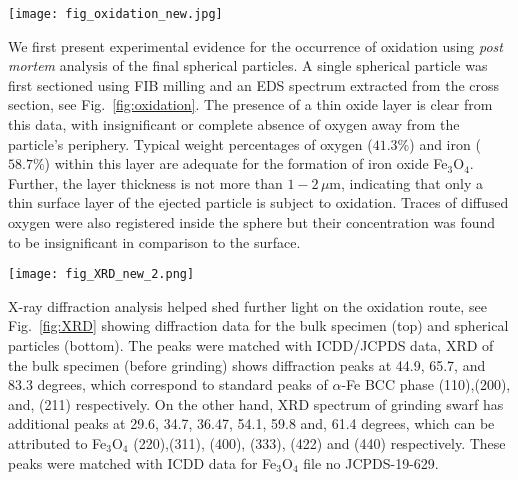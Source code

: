 \documentclass[11pt]{article}
\begin{document}
\begin{figure*}[h!]
   \centering
  \texttt{[image: fig\_oxidation\_new.jpg]}
  \caption{Elemental map showing spatial distribution of elemental oxygen within a thin layer of thickness $\delta$ around $1\%$ of the sphere's radius.}
  \label{fig:oxidation}
\end{figure*}

We first present experimental evidence for the occurrence of oxidation using \emph{post mortem} analysis of the final spherical particles. A single spherical particle was first sectioned using FIB milling and an EDS spectrum extracted from the cross section, see Fig.~\ref{fig:oxidation}. The presence of a thin oxide layer is clear from this data, with insignificant or complete absence of oxygen away from the particle's periphery. Typical weight percentages of oxygen ($41.3\%$) and iron ($58.7\%$) within this layer are adequate for the formation of iron oxide Fe$_3$O$_4$. Further, the layer thickness is not more than $1-2\,\mu$m, indicating that only a thin surface layer of the ejected particle is subject to oxidation. Traces of diffused oxygen were also registered inside the sphere but their concentration was found to be insignificant in comparison to the surface.


\begin{figure*}[h!]
   \centering
  \texttt{[image: fig\_XRD\_new\_2.png]}
  \caption{X-ray diffraction data for the bulk specimen (top row) and the collection of spherical particles (bottom row). Peaks corresponding to Fe$_3$O$_4$ are clearly visible in the bottom plot and are absent in the top.  }
  \label{fig:XRD}
\end{figure*}

X-ray diffraction analysis helped shed further light on the oxidation route, see Fig.~\ref{fig:XRD} showing diffraction data for the bulk specimen (top) and spherical particles (bottom). The peaks were matched with ICDD/JCPDS data, XRD of the bulk specimen (before grinding) shows diffraction peaks at 44.9, 65.7, and 83.3 degrees, which correspond to standard peaks of $\alpha$-Fe BCC phase (110),(200), and, (211) respectively. On the other hand, XRD spectrum of grinding swarf has additional peaks at 29.6, 34.7, 36.47, 54.1, 59.8 and, 61.4 degrees, which can be attributed to Fe$_3$O$_4$ (220),(311), (400), (333), (422) and (440) respectively. These peaks were matched with ICDD data for Fe$_3$O$_4$ file no JCPDS-19-629.
\end{document}
